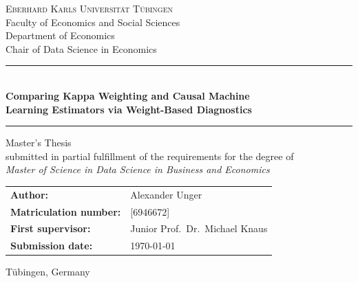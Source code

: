 \documentclass[12pt, a4paper, oneside]{article}
\theoremstyle{plain}
\theoremstyle{definition}
\begin{document}

\begin{titlepage}
  \thispagestyle{empty}
  \centering

  \vspace*{1.5cm}

  {\large \textsc{Eberhard Karls Universität Tübingen}}\\[0.3cm]
  {\large Faculty of Economics and Social Sciences}\\[0.1cm]
  {\normalsize Department of Economics}\\[0.1cm]
  {\normalsize Chair of Data Science in Economics}

  \vspace{1.5cm}

  \rule{\textwidth}{1.5pt}\\[0.4cm]
  {\LARGE \bfseries Comparing Kappa Weighting and Causal Machine \\[0.3cm]
   Learning Estimators via Weight-Based Diagnostics}\\[0.4cm]
  \rule{\textwidth}{1.5pt}

  \vspace{1.5cm}

  {\large Master's Thesis}\\[0.2cm]
  {\normalsize submitted in partial fulfillment of the requirements for the degree of}\\[0.2cm]
  {\large \textit{Master of Science in Data Science in Business and Economics}}

  \vspace{2.0cm}

  \begin{tabular}{ll}
    \textbf{Author:}     & Alexander Unger \\[0.2cm]
    \textbf{Matriculation number:} & [6946672] \\[0.2cm]
    \textbf{First supervisor:}  & Junior Prof.\ Dr.\ Michael Knaus \\[0.2cm]
    \textbf{Submission date:}   & \today \\
  \end{tabular}

  \vfill

  {\small Tübingen, Germany}

\end{titlepage}
\end{document}
